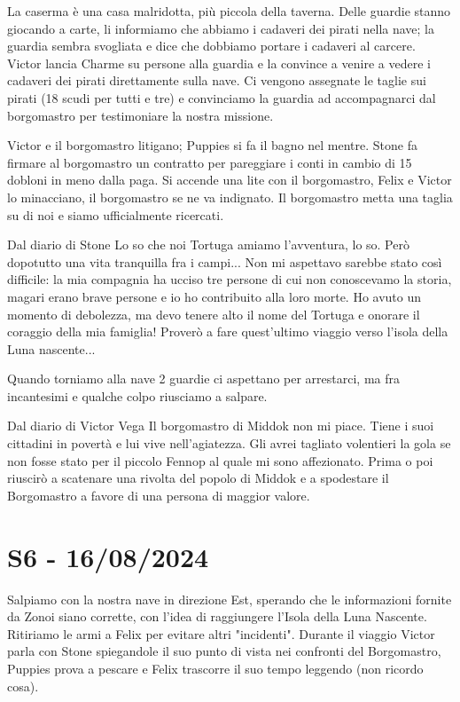 \documentclass[letterpaper,twocolumn,openany, nodeprecatedcode, nomultitoc]{dndbook}
\begin{document}
La caserma è una casa malridotta, più piccola della taverna. Delle guardie stanno giocando a carte, li informiamo che abbiamo i cadaveri dei pirati nella nave; la guardia sembra svogliata e dice che dobbiamo portare i cadaveri al carcere. Victor lancia Charme su persone alla guardia e la convince a venire a vedere i cadaveri dei pirati direttamente sulla nave. Ci vengono assegnate le taglie sui pirati (18 scudi per tutti e tre) e convinciamo la guardia ad accompagnarci dal borgomastro per testimoniare la nostra missione.

Victor e il borgomastro litigano; Puppies si fa il bagno nel mentre. Stone fa firmare al borgomastro un contratto per pareggiare i conti in cambio di 15 dobloni in meno dalla paga. Si accende una lite con il borgomastro, Felix e Victor lo minacciano, il borgomastro se ne va indignato. Il borgomastro metta una taglia su di noi e siamo ufficialmente ricercati.

\begin{DndComment}{Dal diario di Stone}
Lo so che noi Tortuga amiamo l'avventura, lo so. Però dopotutto una vita tranquilla fra i campi... Non mi aspettavo sarebbe stato così difficile: la mia compagnia ha ucciso tre persone di cui non conoscevamo la storia, magari erano brave persone e io ho contribuito alla loro morte. Ho avuto un momento di debolezza, ma devo tenere alto il nome del Tortuga e onorare il coraggio della mia famiglia! Proverò a fare quest'ultimo viaggio verso l'isola della Luna nascente...
\end{DndComment}

Quando torniamo alla nave 2 guardie ci aspettano per arrestarci, ma fra incantesimi e qualche colpo riusciamo a salpare.

\begin{DndComment}{Dal diario di Victor Vega}
Il borgomastro di Middok non mi piace. Tiene i suoi cittadini in povertà e lui vive nell'agiatezza. Gli avrei tagliato volentieri la gola se non fosse stato per il piccolo Fennop al quale mi sono affezionato. Prima o poi riuscirò a scatenare una rivolta del popolo di Middok e a spodestare il Borgomastro a favore di una persona di maggior valore.
\end{DndComment}


\section{S6 - 16/08/2024}
Salpiamo con la nostra nave in direzione Est, sperando che le informazioni fornite da Zonoi siano corrette, con l'idea di raggiungere l'Isola della Luna Nascente. Ritiriamo le armi a Felix per evitare altri "incidenti". Durante il viaggio Victor parla con Stone spiegandole il suo punto di vista nei confronti del Borgomastro, Puppies prova a pescare e Felix trascorre il suo tempo leggendo (non ricordo cosa).
\end{document}
